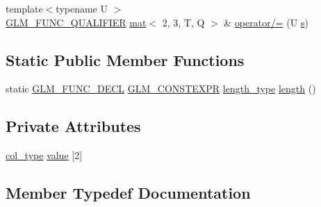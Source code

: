 \begin{DoxyCompactItemize}
\item 
{\footnotesize template$<$typename U $>$ }\\\mbox{\hyperlink{setup_8hpp_a33fdea6f91c5f834105f7415e2a64407}{G\+L\+M\+\_\+\+F\+U\+N\+C\+\_\+\+Q\+U\+A\+L\+I\+F\+I\+ER}} \mbox{\hyperlink{structglm_1_1mat}{mat}}$<$ 2, 3, T, Q $>$ \& \mbox{\hyperlink{structglm_1_1mat_3_012_00_013_00_01_t_00_01_q_01_4_a52c908488ef91afb7a1f68e9e3ddb606}{operator/=}} (U \mbox{\hyperlink{_s_d_l__opengl_8h_a4af680a6c683f88ed67b76f207f2e6e4}{s}})
\end{DoxyCompactItemize}
\subsection*{Static Public Member Functions}
\begin{DoxyCompactItemize}
\item 
static \mbox{\hyperlink{setup_8hpp_ab2d052de21a70539923e9bcbf6e83a51}{G\+L\+M\+\_\+\+F\+U\+N\+C\+\_\+\+D\+E\+CL}} \mbox{\hyperlink{setup_8hpp_a08b807947b47031d3a511f03f89645ad}{G\+L\+M\+\_\+\+C\+O\+N\+S\+T\+E\+X\+PR}} \mbox{\hyperlink{structglm_1_1mat_3_012_00_013_00_01_t_00_01_q_01_4_ad2e2433ba375abcd6bada873f8ea2de1}{length\+\_\+type}} \mbox{\hyperlink{structglm_1_1mat_3_012_00_013_00_01_t_00_01_q_01_4_a77bf3d190cef1bb5d40833ab5913c08f}{length}} ()
\end{DoxyCompactItemize}
\subsection*{Private Attributes}
\begin{DoxyCompactItemize}
\item 
\mbox{\hyperlink{structglm_1_1mat_3_012_00_013_00_01_t_00_01_q_01_4_aebe4faf14ea1bc3092b4bbf591d7194e}{col\+\_\+type}} \mbox{\hyperlink{structglm_1_1mat_3_012_00_013_00_01_t_00_01_q_01_4_a6ffb5e68032090a7980ff22e64eff8cf}{value}} \mbox{[}2\mbox{]}
\end{DoxyCompactItemize}


\subsection{Member Typedef Documentation}
\mbox{\label{structglm_1_1mat_3_012_00_013_00_01_t_00_01_q_01_4_aebe4faf14ea1bc3092b4bbf591d7194e}} 
